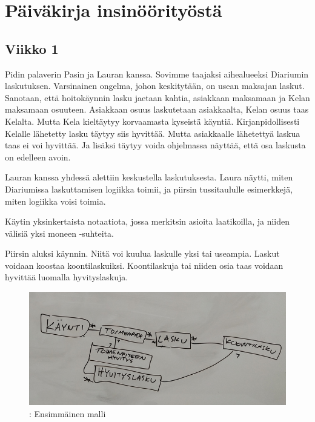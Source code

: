 \vspace{21.5pt}

\hypertarget{puxe4ivuxe4kirja-insinuxf6uxf6rityuxf6stuxe4}{%
\chapter{Päiväkirja
insinöörityöstä}\label{puxe4ivuxe4kirja-insinuxf6uxf6rityuxf6stuxe4}}

\hypertarget{viikko-1}{%
\section{Viikko 1}\label{viikko-1}}

Pidin palaverin Pasin ja Lauran kanssa. Sovimme taajaksi aihealueeksi
Diariumin laskutuksen. Varsinainen ongelma, johon keskitytään, on usean
maksajan laskut. Sanotaan, että hoitokäynnin lasku jaetaan kahtia,
asiakkaan maksamaan ja Kelan maksamaan osuuteen. Asiakkaan osuus
laskutetaan asiakkaalta, Kelan osuus taas Kelalta. Mutta Kela kieltäytyy
korvaamasta kyseistä käyntiä. Kirjanpidollisesti Kelalle lähetetty lasku
täytyy siis hyvittää. Mutta asiakkaalle lähetettyä laskua taas ei voi
hyvittää. Ja lisäksi täytyy voida ohjelmassa näyttää, että osa laskusta
on edelleen avoin.

Lauran kanssa yhdessä alettiin keskustella laskutuksesta. Laura näytti,
miten Diariumissa laskuttamisen logiikka toimii, ja piirsin
tussitaululle esimerkkejä, miten logiikka voisi toimia.

Käytin yksinkertaista notaatiota, jossa merkitsin asioita laatikoilla,
ja niiden välisiä yksi moneen -suhteita.

Piirsin aluksi käynnin. Niitä voi kuulua laskulle yksi tai useampia.
Laskut voidaan koostaa koontilaskuiksi. Koontilaskuja tai niiden osia
taas voidaan hyvittää luomalla hyvityslaskuja.

\begin{figure}
\centering
\includegraphics{illustration/malli1.jpg}
\caption{\label{diarymalli1}: Ensimmäinen malli}
\end{figure}

